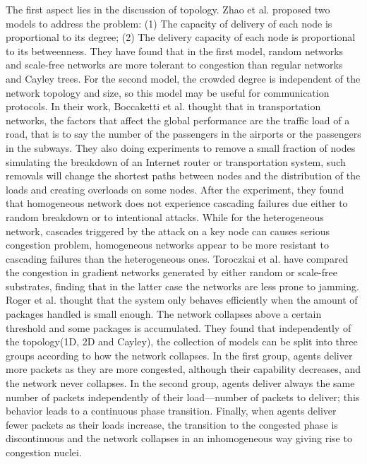 \documentclass[onecolumn,preprintnumbers,amsmath,amssymb]{revtex4}
\begin{document}
The first aspect lies in the discussion of topology.
Zhao et al. proposed two models to address the problem: (1) The capacity of delivery of each node is proportional to its degree; (2) The delivery capacity of each node is proportional to its betweenness. They have found that in the first model, random networks and scale-free networks are more tolerant to congestion than regular networks and Cayley trees. For the second model, the crowded degree is independent of the network topology and size, so this model may be useful for communication protocols\cite{LZY}.
In their work, Boccaketti et al. thought that in transportation networks, the factors that affect the global performance are the traffic load of a road, that is to say the number of the passengers in the airports or the passengers in the subways. They also doing experiments to remove a small fraction of nodes simulating the breakdown of an Internet router or transportation system, such removals will change the shortest paths between nodes and the distribution of the loads and creating overloads on some nodes. After the experiment, they found that homogeneous network does not experience cascading failures due either to random breakdown or to intentional attacks. While for the heterogeneous network, cascades triggered by the attack on a key node can causes serious congestion problem, homogeneous networks appear to be more resistant to cascading failures than the heterogeneous ones\cite{SBVV}.
Toroczkai et al. have compared the congestion in gradient networks generated by either random or scale-free substrates, finding that in the latter case the networks are less prone to jamming\cite{ZTKE,ZTBE}.
Roger et al. thought that the system only behaves efficiently when the amount of packages handled is small enough. The network collapses above a certain threshold and some packages is accumulated. They found that independently of the topology(1D, 2D and Cayley), the collection of models can be split into three groups according to how the network collapses. In the first group, agents deliver more packets as they are more congested, although their capability decreases, and the network never collapses. In the second group, agents deliver always the same number of packets independently of their load—number of packets to deliver; this behavior leads to a continuous phase transition. Finally, when agents deliver fewer packets as their loads increase, the transition to the congested phase is discontinuous and the network collapses in an inhomogeneous way giving rise to congestion nuclei\cite{RGA}.
\end{document}
